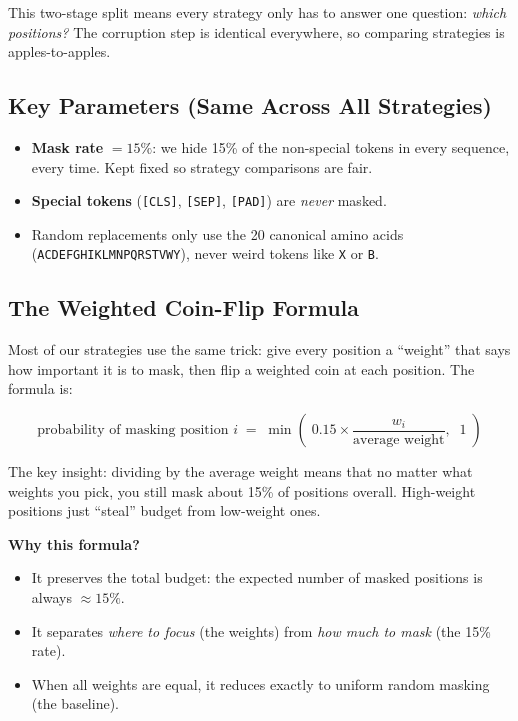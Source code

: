 \documentclass[11pt]{article}
\begin{document}
This two-stage split means every strategy only has to answer one
question: \emph{which positions?} The corruption step is identical
everywhere, so comparing strategies is apples-to-apples.

\subsection{Key Parameters (Same Across All Strategies)}

\begin{itemize}
\item \textbf{Mask rate} $= 15\%$: we hide 15\% of the non-special
      tokens in every sequence, every time. Kept fixed so strategy
      comparisons are fair.
\item \textbf{Special tokens} (\texttt{[CLS]}, \texttt{[SEP]},
      \texttt{[PAD]}) are \emph{never} masked.
\item Random replacements only use the 20 canonical amino acids
      (\texttt{ACDEFGHIKLMNPQRSTVWY}), never weird tokens like
      \texttt{X} or \texttt{B}.
\end{itemize}

\subsection{The Weighted Coin-Flip Formula}
\label{sec:weighted-flip}

Most of our strategies use the same trick: give every position a
``weight'' that says how important it is to mask, then flip a
weighted coin at each position. The formula is:

\begin{equation}
\boxed{\;
\text{probability of masking position } i
\;=\;
\min\!\left(\;
0.15 \times \frac{w_i}{\text{average weight}},
\;\; 1
\;\right)
\;}
\label{eq:weighted-coin}
\end{equation}

The key insight: dividing by the average weight means that no matter
what weights you pick, you still mask about 15\% of positions overall.
High-weight positions just ``steal'' budget from low-weight ones.

\textbf{Why this formula?}
\begin{itemize}
\item It preserves the total budget: the expected number of masked
      positions is always $\approx 15\%$.
\item It separates \emph{where to focus} (the weights) from
      \emph{how much to mask} (the 15\% rate).
\item When all weights are equal, it reduces exactly to uniform
      random masking (the baseline).
\end{itemize}
\end{document}
